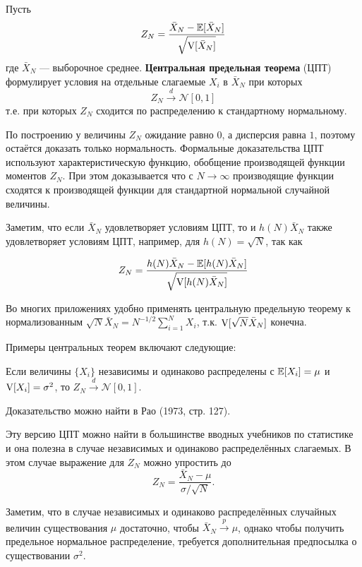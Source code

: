\begin{theorem}
Пусть 
\begin{equation}
Z_N=\frac{\bar{X}_N-\mathbb{E}[\bar{X}_N]}{\sqrt{\mathrm{V}[\bar{X}_N]}}
\end{equation}
где $\bar{X}_N$ --- выборочное среднее. \textbf{Центральная предельная теорема} (ЦПТ) формулирует условия на отдельные слагаемые $X_i$ в $\bar{X}_N$ при которых
\begin{equation}
Z_N \overset{d}{\to} \mathcal{N} [0,1]
\end{equation}
т.е. при которых $Z_N$ сходится по распределению к стандартному нормальному.
\end{theorem}

По построению у величины $Z_N$ ожидание равно $0$, а дисперсия равна $1$, поэтому остаётся доказать только нормальность. Формальные доказательства ЦПТ используют характеристическую функцию, обобщение производящей функции моментов $Z_N$. При этом доказывается что с $N\to \infty$ производящие функции сходятся к производящей функции для стандартной нормальной случайной величины.

Заметим, что если $\bar{X}_N$ удовлетворяет условиям ЦПТ, то и $h(N)\bar{X}_N$ также удовлетворяет условиям ЦПТ, например, для $h(N)=\sqrt{N}$, так как

\[
Z_N=\frac{h(N)\bar{X}_N-\mathbb{E}[h(N)\bar{X}_N]}{\sqrt{\mathrm{V}[h(N)\bar{X}_N]}}
\]

Во многих приложениях удобно применять центральную предельную теорему к нормализованным $\sqrt{N}\bar{X}_N=N^{-1/2}\sum_{i=1}^{N} X_i$, т.к. $\mathrm{V}[\sqrt{N}\bar{X}_N]$ конечна.

Примеры центральных теорем включают следующие:

\begin{theorem}
\label{th:A14}
Если величины $\{X_i\}$ независимы и одинаково распределены с $\mathbb{E}[X_i]=\mu$ и $\mathrm{V}[X_i]=\sigma^2$, то $Z_N \overset{d}{\to} \mathcal{N}[0,1]$.
\end{theorem}

Доказательство можно найти в Рао (1973, стр. 127).

Эту версию ЦПТ можно найти в большинстве вводных учебников по статистике и она полезна в случае независимых и одинаково распределённых слагаемых. В этом случае выражение для $Z_N$ можно упростить до
\[
Z_N=\frac{\bar{X}_N-\mu}{\sigma/\sqrt{N}}.
\]

Заметим, что в случае независимых и одинаково распределённых случайных величин существования $\mu$ достаточно, чтобы $\bar{X}_N \overset{p}{\to} \mu$, однако чтобы получить предельное нормальное распределение, требуется дополнительная предпосылка о существовании $\sigma^2$.

